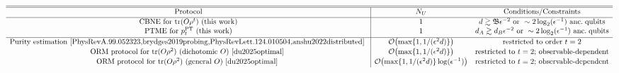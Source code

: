 \documentclass[aps,prl,twocolumn,nofootinbib,superscriptaddress,10pt]{revtex4-2}
\let\originalleft\left
\let\originalright\right
\renewcommand{\left}{\mathopen{}\mathclose\bgroup\originalleft}
\renewcommand{\right}{\aftergroup\egroup\originalright}
\DeclareMathOperator{\Tr}{tr}
\newcommand{\bigo}[1]{\mathcal{O}\left(#1\right)}
\theoremstyle{plain}
\theoremstyle{definition}
\newcommand{\PT}{\mathrm{PT}}
\begin{document}
\begin{table}
\centering
\caption{\label{tab:compare}
Comparison of the number of measurement settings \(N_U\) required 
by various protocols for estimating nonlinear properties with single-copy operations
(see SM Sec.~\ref{sec:comparison} for details). 
Here, \(n\) is the qubit number of the target state \(\rho\), \(d=2^n\) is the system dimension, 
\(d_A\) and \(d_B\) are subsystem dimensions, 
\(\epsilon\) is the target additive error, 
\(\mathfrak{B}=\max\{\Tr(O_0^2),1\}\), and ``dichotomic'' means Hermitian with eigenvalues \(\pm1\). 
Previous purity-estimation protocols and the ORM protocol for dichotomic observables can also achieve single-setting estimation in the large-\(d\) regime or using a few ancillary qubits, but only for order \(t=2\).
}
\begin{math}
\begin{array}{c|cc}
\hline\hline
\text{Protocol} & N_U & \text{Conditions/Constraints} \\[0.3ex]
\hline
\text{CBNE for $\Tr(O\rho^t)$ (this work)} 
& 1 
& d \gtrsim \mathfrak{B} \epsilon^{-2} \ \text{or}\ \sim 2\log_2(\epsilon^{-1}) \ \text{anc.\! qubits} \\[0.1ex]

\text{PTME for $p_t^{\PT}$ (this work)} 
& 1 
& d_A \gtrsim d_B \epsilon^{-2} \ \text{or}\ \sim 2\log_2(\epsilon^{-1}) \ \text{anc.\! qubits} \\[0.5ex]

\hline

\text{Purity estimation
\cite{PhysRevA.99.052323,brydges2019probing,PhysRevLett.124.010504,anshu2022distributed}
} 
& \bigo{\max\lbrace 1, 1/(\epsilon^2 d) \rbrace}
& \text{restricted to order} \ t=2 \\[0.3ex]

\text{ORM protocol for $\Tr(O\rho^2)$
(dichotomic $O$) \cite{du2025optimal} 
} 
& \bigo{\max\lbrace 1, 1/(\epsilon^2 d) \rbrace }
& \text{restricted to $t=2$; observable-dependent} \\[0.3ex]


\text{ORM protocol for $\Tr(O\rho^2)$
(general $O$) \cite{du2025optimal} 
} 
& \bigo{\max\lbrace 1, 1/(\epsilon^2 d) \rbrace
\log(\epsilon^{-1}) }
& \text{restricted to $t=2$; observable-dependent} \\[0.3ex]


\end{array}
\end{math}
\end{table}
\end{document}
